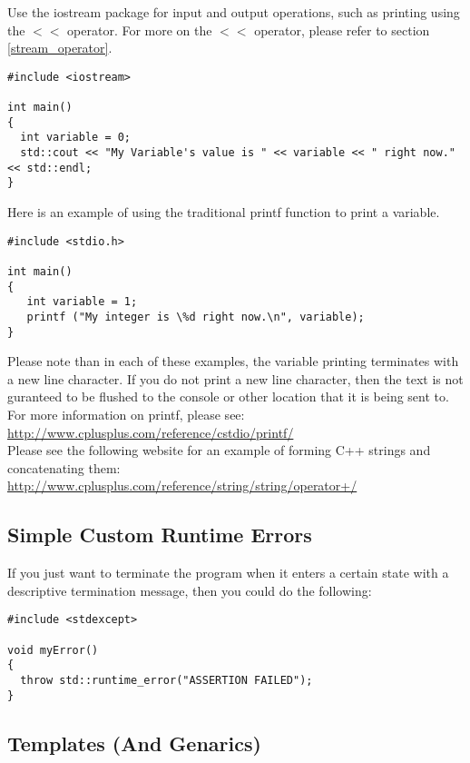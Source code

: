 \documentclass[12pt, letterpaper]{article}
\begin{document}
Use the iostream package for input and output operations, such as printing using the $<<$ operator. For more on the $<<$ operator, please refer to section \ref{stream_operator}.

\begin{verbatim}
#include <iostream> 

int main()
{
  int variable = 0;
  std::cout << "My Variable's value is " << variable << " right now." << std::endl;
}
\end{verbatim}

Here is an example of using the traditional printf function to print a variable.

\begin{verbatim}
#include <stdio.h>

int main()
{
   int variable = 1;
   printf ("My integer is \%d right now.\n", variable);
}
\end{verbatim}

Please note than in each of these examples, the variable printing terminates with a new line character. If you do not print a new line character, then the text is not guranteed to be flushed to the console or other location that it is being sent to.\\

For more information on printf, please see:
\href{http://www.cplusplus.com/reference/cstdio/printf/}{http://www.cplusplus.com/reference/cstdio/printf/}\\

Please see the following website for an example of forming C++ strings and concatenating them:
\href{http://www.cplusplus.com/reference/string/string/operator+/}{http://www.cplusplus.com/reference/string/string/operator+/}

\subsection{Simple Custom Runtime Errors}

If you just want to terminate the program when it enters a certain state with a descriptive termination message, then you could do the following:

\begin{verbatim}
#include <stdexcept>

void myError()
{
  throw std::runtime_error("ASSERTION FAILED");
}

\end{verbatim}

\subsection{Templates (And Genarics)}
\end{document}
